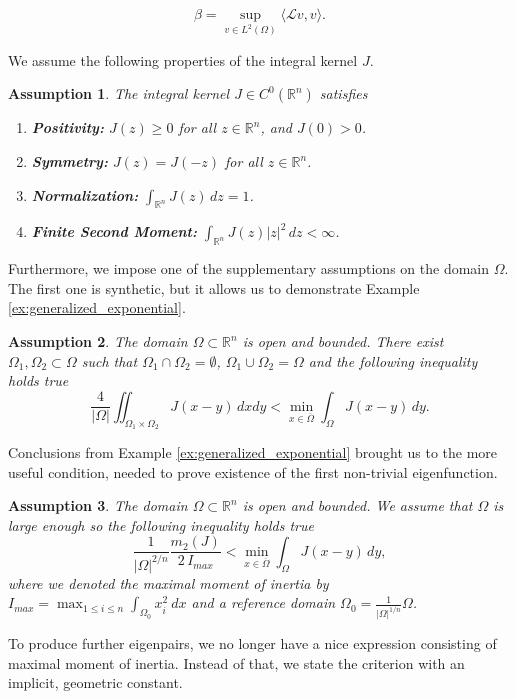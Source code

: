 \documentclass[12pt, a4paper]{article}
\theoremstyle{break}
\theoremstyle{break}
\theoremstyle{break}
\newtheorem{asm}{Assumption}[section]
\theoremstyle{break}
\theoremstyle{break}
\theoremstyle{break}
\theoremstyle{break}
\theoremstyle{break}
\theoremstyle{break}
\begin{document}
\begin{equation}
    \beta = \sup_{v \in L^2(\Omega)} \langle \mathcal{L} v, v\rangle.
\end{equation}

We assume the following properties of the integral kernel $J$.

\begin{asm} 
    \label{asm:KernelProperties}
    The integral kernel $J \in C^0(\mathbb{R}^n)$ satisfies
    \begin{enumerate}[label=(\textit{J\arabic*})]
        \item \textbf{Positivity:} $J(z) \geq 0$ for all $z \in \mathbb{R}^n$, and $J(0) > 0$.
        \item \textbf{Symmetry:} $J(z) = J(-z)$ for all $z \in \mathbb{R}^n$.
        \item \textbf{Normalization:} $\int_{\mathbb{R}^n} J(z) \, dz = 1$.
        \item \textbf{Finite Second Moment:} $\int_{\mathbb{R}^n} J(z)|z|^2 \, dz < \infty$.
    \end{enumerate}
\end{asm}

Furthermore, we impose one of the supplementary assumptions on the domain $\Omega$. The first one is synthetic, but it allows us to demonstrate Example \ref{ex:generalized_exponential}.

\begin{asm}
    \label{asm:DomainProperties_1}
    The domain $\Omega \subset \mathbb{R}^n$ is open and bounded. There exist $\Omega_1, \Omega_2 \subset \Omega$ such that $\Omega_1 \cap \Omega_2 = \emptyset$, $\Omega_1 \cup \Omega_2 = \Omega$ and the following inequality holds true
    \begin{equation}\label{eq:sufficient_cond}
        \frac{4}{|\Omega|} \iint_{\Omega_1 \times \Omega_2} J(x-y) \, dx dy < \min_{x \in \overline{\Omega}} \int_\Omega J(x-y) \, dy.
    \end{equation}
\end{asm}
Conclusions from Example \ref{ex:generalized_exponential} brought us to the more useful condition, needed to prove existence of the first non-trivial eigenfunction.

\begin{asm}
    \label{asm:DomainProperties_2}
    The domain $\Omega \subset \mathbb{R}^n$ is open and bounded. We assume that $\Omega$ is large enough so the following inequality holds true
    \begin{equation} \label{eq:variance_condition}
        \frac{1}{|\Omega|^{2/n}}\frac{m_2(J)}{2 \, I_{max}} < \min_{x \in \overline{\Omega}} \int_\Omega J(x-y) \, dy,
    \end{equation}
    where we denoted the maximal moment of inertia by $I_{max} = \max_{1\leq i \leq n} \int_{\Omega_0} x_i^2 \:dx$ and a reference domain $\Omega_0 = \frac{1}{|\Omega|^{1/n}}\Omega$.
\end{asm}
To produce further eigenpairs, we no longer have a nice expression consisting of maximal moment of inertia. Instead of that, we state the criterion with an implicit, geometric constant.
\end{document}
